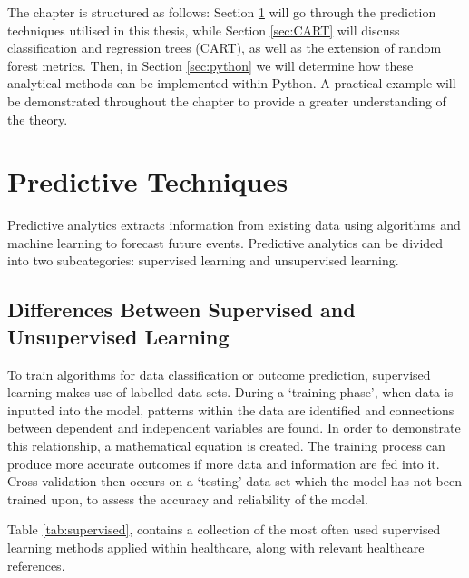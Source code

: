 \documentclass[../thesis.tex]{subfiles}
\begin{document}
The chapter is structured as follows: Section \ref{sec:PredictiveTechniques} will go through the prediction techniques utilised in this thesis, while Section \ref{sec:CART} will discuss classification and regression trees (CART), as well as the extension of random forest metrics. Then, in Section \ref{sec:python} we will determine how these analytical methods can be implemented within Python. A practical example will be demonstrated throughout the chapter to provide a greater understanding of the theory.

\section{Predictive Techniques}\label{sec:PredictiveTechniques}
Predictive analytics extracts information from existing data using algorithms and machine learning to forecast future events. Predictive analytics can be divided into two subcategories: supervised learning and unsupervised learning.

\subsection{Differences Between Supervised and Unsupervised Learning}
To train algorithms for data classification or outcome prediction, supervised learning makes use of labelled data sets. During a `training phase', when data is inputted into the model, patterns within the data are identified and connections between dependent and independent variables are found. In order to demonstrate this relationship, a mathematical equation is created. The training process can produce more accurate outcomes if more data and information are fed into it. Cross-validation then occurs on a `testing' data set which the model has not been trained upon, to assess the accuracy and reliability of the model.

Table \ref{tab:supervised}, contains a collection of the most often used supervised learning methods applied within healthcare, along with relevant healthcare references. 
\end{document}
